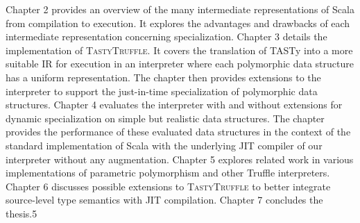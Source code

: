 Chapter 2 provides an overview of the many intermediate representations of Scala from compilation to execution.
It explores the advantages and drawbacks of each intermediate representation concerning specialization.
Chapter 3 details the implementation of \textsc{TastyTruffle}.
It covers the translation of TASTy into a more suitable IR for execution in an interpreter where each polymorphic data structure has a uniform representation.
The chapter then provides extensions to the interpreter to support the just-in-time specialization of polymorphic data structures.
Chapter 4 evaluates the interpreter with and without extensions for dynamic specialization on simple but realistic data structures.
The chapter provides the performance of these evaluated data structures in the context of the standard implementation of Scala with the underlying JIT compiler of our interpreter without any augmentation.
Chapter 5 explores related work in various implementations of parametric polymorphism and other Truffle interpreters.
Chapter 6 discusses possible extensions to \textsc{TastyTruffle} to better integrate source-level type semantics with JIT compilation.
Chapter 7 concludes the thesis.5\label{key}